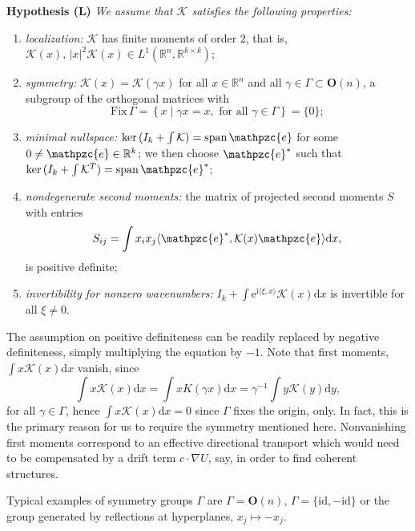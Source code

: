 \documentclass[10pt]{article}
\newenvironment{Hypothesis}[1]%
  {\begin{trivlist}\item[]{\bf Hypothesis #1 }\em}{\end{trivlist}}
\newcommand{\R}{\mathbb{R}}
\newcommand{\Ns}{\mathrm{ker\,}}
\newcommand{\rmd}{\mathrm{d}}
\newcommand{\rme}{\mathrm{e}}
\newcommand{\rmi}{\mathrm{i}}
\newcommand{\K}{\mathcal{K}}
\newcommand{\e}{\mathpzc{e}}
\begin{document}
\begin{Hypothesis}{(L)}We assume that  $\K$ satisfies the following properties:
\begin{enumerate}
\item \emph{localization:  }$\K$ has finite moments of order 2, that is, $\K(x),\, |x|^2\K(x) \in L^1(\R^n,\R^{k\times k})$;
\item \emph{symmetry: } $\K(x)=\K(\gamma x)$ for all $x\in\R^n$ and all $\gamma \in \Gamma\subset \mathbf{O}(n)$, a subgroup of the orthogonal matrices with 
\[
\mathrm{Fix}\, \Gamma=\left\{x\mid\gamma x=x, \mbox{ for all } \gamma\in\Gamma\right\}=\{0\};
\]
\item \emph{minimal nullspace: } $\Ns(I_k+\int\K)=\mathrm{span}\, {\e}$ for some  $ 0\neq {\e}\in \R^k$; we then choose ${\e}^*$ such that   $\Ns(I_k+\int\K^T)=\mathrm{span}\, {\e}^*$;
\item \emph{nondegenerate second moments:}  the matrix of projected second moments $S$ with entries 
\[
S_{ij}=\int x_ix_j \langle{\e}^*,\K(x) {\e}\rangle\rmd x,
\]
is positive definite;
\item \emph{invertibility for nonzero wavenumbers: } $I_k+ \int \rme^{\rmi \langle \xi,x\rangle}\K(x)\rmd x$ is invertible for all $\xi\neq 0$. 
\end{enumerate}
\end{Hypothesis}
The assumption on positive definiteness can be readily replaced by negative definiteness, simply multiplying the equation by $-1$. 
Note that first moments, $\int x\K(x)\rmd x$ vanish, since
\begin{equation}\label{e:1st}
\int x \K(x)\rmd x=\int x K(\gamma x)\rmd x= \gamma^{-1}\int y \K(y)\rmd y,
\end{equation}
for all $\gamma\in \Gamma$, hence $\int x \K(x)\rmd x=0$ since $\Gamma$ fixes the origin, only. In fact, this is the primary reason for us to require the symmetry mentioned here. Nonvanishing first moments correspond to an effective directional transport which would need to be compensated by a drift term $c\cdot \nabla U$, say, in order to find coherent structures. 

Typical examples of symmetry groups $\Gamma$ are $\Gamma=\mathbf{O}(n)$, $\Gamma=\{\mathrm{id},-\mathrm{id}\}$ or the group generated by reflections at hyperplanes, $x_j\mapsto -x_j$. 
\end{document}
